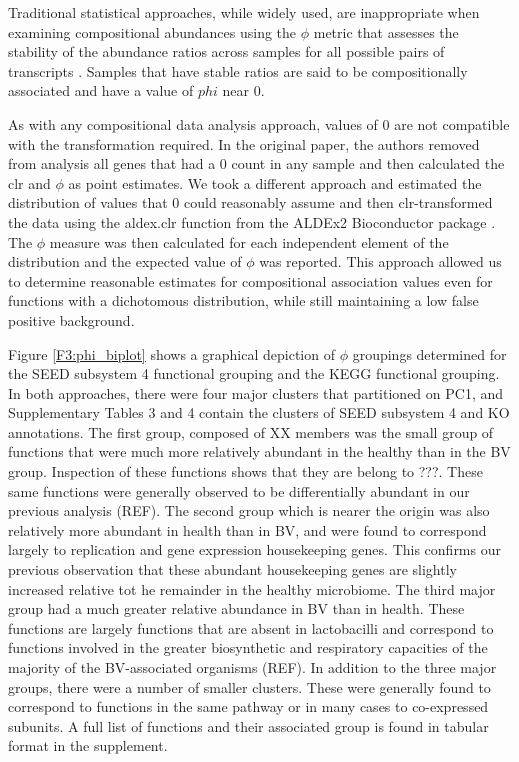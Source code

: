 \documentclass[10pt,letterpaper]{article}
\begin{document}
Traditional statistical approaches, while widely used, are inappropriate when examining compositional  abundances using the $\phi$ metric that assesses the stability of the abundance ratios across samples for all possible pairs of transcripts \cite{Lovell:2015}. Samples that have stable ratios are said to be compositionally associated and have a value of $phi$ near 0. 

As with any compositional data analysis approach, values of 0 are not compatible with the transformation required. In the original paper, the authors removed from analysis all genes that had a 0 count in any sample and then calculated the clr and $\phi$ as point estimates. We took a different approach and estimated the distribution of values that 0 could reasonably assume and then clr-transformed the data using the aldex.clr function from the ALDEx2 Bioconductor package \cite{fernandes:2013, fernandes:2014}. The $\phi$ measure was then calculated for each independent element of the distribution and the expected value of $\phi$ was reported. This approach allowed us to determine reasonable estimates for compositional association values even for functions with a dichotomous distribution, while still maintaining a low false positive background. 

Figure \ref{F3:phi_biplot} shows a graphical depiction of $\phi$ groupings determined for the SEED subsystem 4 functional grouping and the KEGG functional grouping. In both approaches, there were four major clusters that partitioned on PC1, and Supplementary Tables 3 and 4 contain the clusters of SEED subsystem 4 and KO annotations. The first group, composed of XX members was the small group of functions that were much more relatively abundant in the healthy than in the BV group. Inspection of these functions shows that they are belong to ???. These same functions were generally observed to be differentially abundant in our previous analysis (REF). The second group which is nearer the origin was also relatively more abundant in health than in BV, and were found to correspond largely to replication and gene expression housekeeping genes. This confirms our previous observation that these abundant housekeeping genes are slightly increased relative tot he remainder in the healthy microbiome. The third major group had a much greater relative abundance in BV than in health. These functions are largely functions that are absent in lactobacilli and correspond to functions involved in the greater biosynthetic and respiratory capacities of the majority of the BV-associated organisms (REF). In addition to the three major groups, there were a number of smaller clusters. These were generally found to correspond to functions in the same pathway or in many cases to co-expressed subunits.  A full list of functions and their associated group is found in tabular format in the supplement. 
\end{document}
